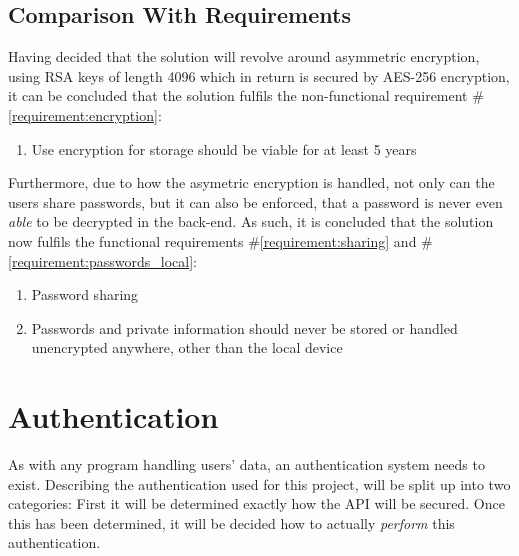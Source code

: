 		\subsection{Comparison With Requirements}
			\label{requirement:fulfilled:sharing}
			\label{requirement:fulfilled:passwords_local}
			\label{requirement:fulfilled:encryption}
			Having decided that the solution will revolve around asymmetric encryption, using RSA keys of length 4096 which in return is secured by AES-256 encryption, it can be concluded that the solution fulfils the non-functional requirement \#\ref{requirement:encryption}:

			\vspace{-3ex}\begin{enumerate}
				\setlength\itemsep{0.1em}
				\setcounter{enumi}{4-1}
				\item Use encryption for storage should be viable for at least 5 years
			\end{enumerate}

			Furthermore, due to how the asymetric encryption is handled, not only can the users share passwords, but it can also be enforced, that a password is never even \emph{able} to be decrypted in the back-end. As such, it is concluded that the solution now fulfils the functional requirements \#\ref{requirement:sharing} and \#\ref{requirement:passwords_local}:
			\vspace{-3ex}\begin{enumerate}
				\setlength\itemsep{0.1em}
				\setcounter{enumi}{5-1}
				\item Password sharing
				\setcounter{enumi}{9-1}
				\item Passwords and private information should never be stored or handled unencrypted anywhere, other than the local device
			\end{enumerate}




	\section{Authentication}
		\label{sec:design:authentication}
		As with any program handling users' data, an authentication system needs to exist. Describing the authentication used for this project, will be split up into two categories: First it will be determined exactly how the API will be secured. Once this has been determined, it will be decided how to actually \emph{perform} this authentication.

